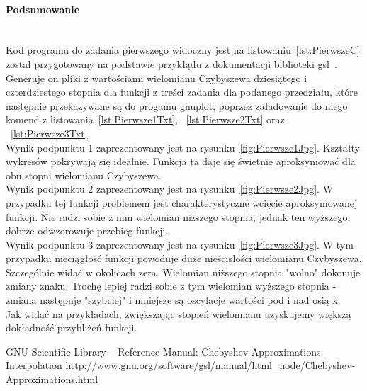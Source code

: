 \paragraph{Podsumowanie}~\\
Kod programu do zadania pierwszego widoczny jest na listowaniu~\ref{lst:PierwszeC} został przygotowany na podstawie przykłądu z dokumentacji biblioteki gsl~\cite{GslManualChebyshevApproximations}.
Generuje on pliki z wartościami wielomianu Czybyszewa dziesiątego i czterdziestego stopnia dla funkcji z treści zadania dla podanego przedziału, które następnie przekazywane są do progamu gnuplot, poprzez załadowanie do niego komend z listowania~\ref{lst:Pierwsze1Txt}, ~\ref{lst:Pierwsze2Txt} oraz ~\ref{lst:Pierwsze3Txt}.
\\
Wynik podpunktu 1 zaprezentowany jest na rysunku~\ref{fig:Pierwsze1Jpg}.
Kształty wykresów pokrywają się idealnie.
Funkcja ta daje się świetnie aproksymować dla obu stopni wielomianu Czybyszewa.
\\
Wynik podpunktu 2 zaprezentowany jest na rysunku~\ref{fig:Pierwsze2Jpg}.
W przypadku tej funkcji problemem jest charakterystyczne wcięcie aproksymowanej funkcji.
Nie radzi sobie z nim wielomian niższego stopnia, jednak ten wyższego, dobrze odwzorowuje przebieg funkcji.
\\
Wynik podpunktu 3 zaprezentowany jest na rysunku~\ref{fig:Pierwsze3Jpg}.
W tym przypadku nieciągłość funkcji powoduje duże nieścisłości wielomianu Czybyszewa.
Szczególnie widać w okolicach zera.
Wielomian niższego stopnia "wolno" dokonuje zmiany znaku.
Trochę lepiej radzi sobie z tym wielomian wyższego stopnia - zmiana następuje "szybciej" i mniejsze są oscylacje wartości pod i nad osią x.
\\
Jak widać na przykładach, zwiększając stopień wielomianu uzyskujemy większą dokładność przybliżeń funkcji.

\begin{thebibliography}{9}
   GNU Scientific Library – Reference Manual: Chebyshev Approximations: Interpolation http://www.gnu.org/software/gsl/manual/html\_node/Chebyshev-Approximations.html
\end{thebibliography}
